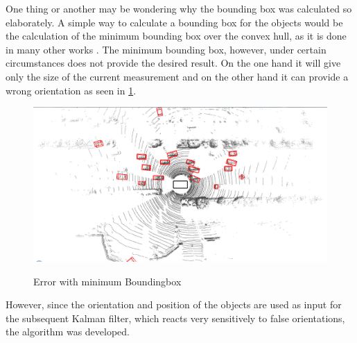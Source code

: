 \documentclass[11pt,oneside,openright]{mpreport}
\begin{document}

One thing or another may be wondering why the bounding box was calculated so elaborately. A simple way to calculate a bounding box for the
objects would be the calculation of the minimum bounding box over the convex hull, as it is done in many other works \cite{Zhang, Himmelsbach2009}.
The minimum bounding box, however, under certain circumstances does not provide the desired result. On the one hand it will give only the size of the current measurement and on the 
other hand it can provide a wrong orientation as seen in \cref{min_box}.

\begin{figure}[!ht]
\caption{Error with minimum Boundingbox \cite{Zhang}}
\includegraphics[width=\textwidth]{bilder/min_bound_wrong.png}
\label{min_box}
\end{figure}


However, since the orientation and position of the objects are used as input for the subsequent Kalman filter, which reacts very sensitively to false orientations, the algorithm was developed.
\end{document}

